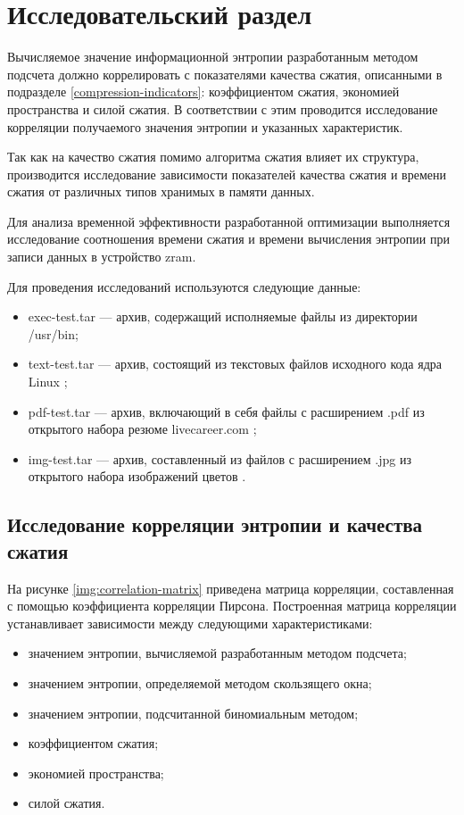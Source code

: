 \chapter{Исследовательский раздел}\label{research}

Вычисляемое значение информационной энтропии разработанным методом подсчета должно коррелировать с показателями качества сжатия, описанными в подразделе \ref{compression-indicators}: коэффициентом сжатия, экономией пространства и силой сжатия. В соответствии с этим проводится исследование корреляции получаемого значения энтропии и указанных характеристик.

Так как на качество сжатия помимо алгоритма сжатия влияет их структура, производится исследование зависимости показателей качества сжатия и времени сжатия от различных типов хранимых в памяти данных.

Для анализа временной эффективности разработанной оптимизации выполняется исследование соотношения времени сжатия и времени вычисления энтропии при записи данных в устройство zram.

Для проведения исследований используются следующие данные:

\begin{itemize}
    \item exec-test.tar --- архив, содержащий исполняемые файлы из директории /usr/bin;
    \item text-test.tar --- архив, состоящий из текстовых файлов исходного кода ядра Linux \cite{linux-code};
    \item pdf-test.tar --- архив, включающий в себя файлы с расширением .pdf из открытого набора резюме livecareer.com \cite{resume-dataset};
    \item img-test.tar --- архив, составленный из файлов с расширением .jpg из открытого набора изображений цветов \cite{flowers-dataset}.
\end{itemize}

\section{Исследование корреляции энтропии и качества сжатия}

На рисунке \ref{img:correlation-matrix} приведена матрица корреляции, составленная с помощью коэффициента корреляции Пирсона. Построенная матрица корреляции устанавливает зависимости между следующими характеристиками:

\begin{itemize}
    \item значением энтропии, вычисляемой разработанным методом подсчета;
    \item значением энтропии, определяемой методом скользящего окна;
    \item значением энтропии, подсчитанной биномиальным методом;
    \item коэффициентом сжатия;
    \item экономией пространства;
    \item силой сжатия.
\end{itemize}

